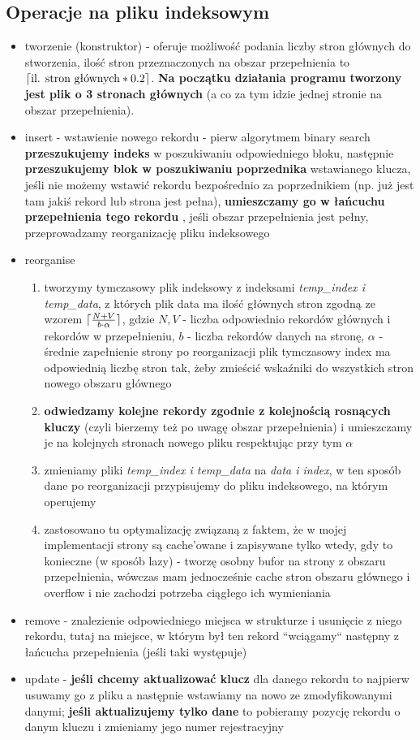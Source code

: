 \documentclass{article}
\DeclarePairedDelimiter\ceil{\lceil}{\rceil}
\begin{document}
\subsection{Operacje na pliku indeksowym}
\begin{itemize}
\item tworzenie (konstruktor) - oferuje możliwość podania liczby stron głównych do stworzenia, ilość
	stron przeznaczonych na obszar przepełnienia to $\ceil{\text{il.  stron głównych} * 0.2}$. \textbf{Na początku działania programu tworzony jest plik o 3 stronach głównych} (a co za tym idzie jednej stronie na obszar przepełnienia).
\item insert - wstawienie nowego rekordu - pierw algorytmem binary search \textbf{przeszukujemy indeks} w poszukiwaniu odpowiedniego bloku,  następnie \textbf{przeszukujemy blok w poszukiwaniu poprzednika} wstawianego klucza, jeśli nie możemy wstawić rekordu bezpośrednio za poprzednikiem (np. już jest tam jakiś rekord lub strona jest pełna),  \textbf{umieszczamy go w łańcuchu przepełnienia tego rekordu} , jeśli obszar przepełnienia jest pełny, przeprowadzamy reorganizację pliku indeksowego
\item reorganise 
\begin{enumerate}
	\item tworzymy tymczasowy plik indeksowy z indeksami \textit{temp\_index i temp\_data}, z których plik data ma ilość głównych stron zgodną ze wzorem $\ceil{\frac{N+V}{b\cdot\alpha}}$,  gdzie $N,V$ - liczba odpowiednio  rekordów głównych i rekordów w przepełnieniu, $b$ - liczba rekordów danych na stronę, $\alpha$ - średnie zapełnienie strony po reorganizacji
 plik tymczasowy index ma odpowiednią liczbę stron tak, żeby zmieścić wskaźniki do wszystkich stron nowego obszaru głównego
	\item \textbf{odwiedzamy kolejne rekordy zgodnie z kolejnością rosnących kluczy} (czyli bierzemy też po uwagę obszar przepełnienia) i umieszczamy je na kolejnych stronach nowego pliku respektując przy tym $\alpha$
	\item zmieniamy pliki \textit{temp\_index i temp\_data} na \textit{data i index},  w ten sposób dane po reorganizacji przypisujemy do pliku indeksowego, na którym operujemy
	\item zastosowano tu optymalizację związaną z faktem, że w mojej implementacji strony są cache'owane i zapisywane tylko wtedy, gdy to konieczne (w sposób lazy) - tworzę osobny bufor na strony z obszaru przepełnienia, wówczas mam jednocześnie cache stron obszaru głównego i overflow i  nie zachodzi potrzeba ciągłego ich wymieniania
\end{enumerate}
\item remove - znalezienie odpowiedniego miejsca w strukturze i usunięcie z niego rekordu, tutaj na miejsce, w którym był ten rekord ``wciągamy`` następny z łańcucha przepełnienia (jeśli taki występuje)
\item update - \textbf{jeśli chcemy aktualizować klucz} dla danego rekordu to najpierw usuwamy go z pliku a następnie wstawiamy na nowo ze zmodyfikowanymi danymi; \textbf{jeśli aktualizujemy tylko dane} to pobieramy pozycję rekordu o danym kluczu i zmieniamy jego numer rejestracyjny
\end{itemize}
\end{document}
